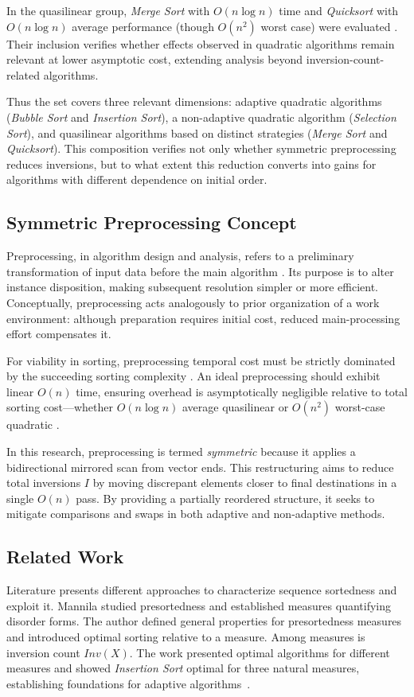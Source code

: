 \documentclass[namedate,webpdf,contemporary,large]{TBench-template}%
\theoremstyle{thmstyleone}%
\theoremstyle{thmstyletwo}%
\theoremstyle{thmstylethree}%
\begin{document}
In the quasilinear group, \emph{Merge Sort} with $O(n \log n)$ time and \emph{Quicksort} with $O(n \log n)$ average performance (though $O(n^2)$ worst case) were evaluated \cite{cormen_introduction_2022}. Their inclusion verifies whether effects observed in quadratic algorithms remain relevant at lower asymptotic cost, extending analysis beyond inversion-count-related algorithms.

Thus the set covers three relevant dimensions: adaptive quadratic algorithms (\emph{Bubble Sort} and \emph{Insertion Sort}), a non-adaptive quadratic algorithm (\emph{Selection Sort}), and quasilinear algorithms based on distinct strategies (\emph{Merge Sort} and \emph{Quicksort}). This composition verifies not only whether symmetric preprocessing reduces inversions, but to what extent this reduction converts into gains for algorithms with different dependence on initial order.

\subsection{Symmetric Preprocessing Concept}
Preprocessing, in algorithm design and analysis, refers to a preliminary transformation of input data before the main algorithm \cite{cormen_introduction_2022}. Its purpose is to alter instance disposition, making subsequent resolution simpler or more efficient. Conceptually, preprocessing acts analogously to prior organization of a work environment: although preparation requires initial cost, reduced main-processing effort compensates it.

For viability in sorting, preprocessing temporal cost must be strictly dominated by the succeeding sorting complexity \cite{cormen_introduction_2022,sedgewick_algorithms_2011}. An ideal preprocessing should exhibit linear $O(n)$ time, ensuring overhead is asymptotically negligible relative to total sorting cost---whether $O(n \log n)$ average quasilinear or $O(n^2)$ worst-case quadratic \cite{knuth_art_1973}.

In this research, preprocessing is termed \emph{symmetric} because it applies a bidirectional mirrored scan from vector ends. This restructuring aims to reduce total inversions $I$ by moving discrepant elements closer to final destinations in a single $O(n)$ pass. By providing a partially reordered structure, it seeks to mitigate comparisons and swaps in both adaptive and non-adaptive methods.

\subsection{Related Work}
Literature presents different approaches to characterize sequence sortedness and exploit it. Mannila \cite{mannila_measures_1984} studied presortedness and established measures quantifying disorder forms. The author defined general properties for presortedness measures and introduced optimal sorting relative to a measure. Among measures is inversion count $Inv(X)$. The work presented optimal algorithms for different measures and showed \emph{Insertion Sort} optimal for three natural measures, establishing foundations for adaptive algorithms~\cite{mannila_measures_1984}.
\end{document}
